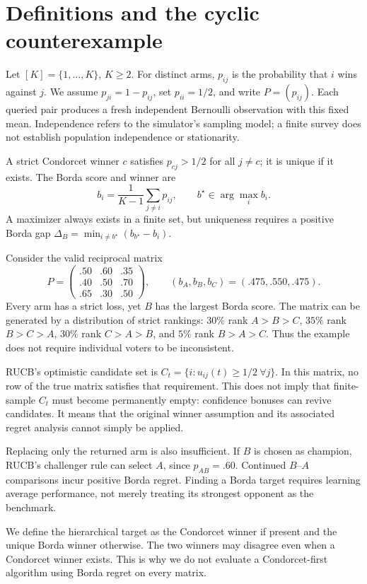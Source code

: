 \documentclass[11pt,a4paper]{article}
\begin{document}
\section{Definitions and the cyclic counterexample}

Let $[K]=\{1,\ldots,K\}$, $K\ge2$. For distinct arms, $p_{ij}$ is the probability that $i$ wins against $j$. We assume $p_{ji}=1-p_{ij}$, set $p_{ii}=1/2$, and write $P=(p_{ij})$. Each queried pair produces a fresh independent Bernoulli observation with this fixed mean. Independence refers to the simulator's sampling model; a finite survey does not establish population independence or stationarity.

A strict Condorcet winner $c$ satisfies $p_{cj}>1/2$ for all $j\ne c$; it is unique if it exists. The Borda score and winner are
\[
b_i=\frac{1}{K-1}\sum_{j\ne i}p_{ij},\qquad b^\star\in\arg\max_i b_i.
\]
A maximizer always exists in a finite set, but uniqueness requires a positive Borda gap $\Delta_B=\min_{i\ne b^\star}(b_{b^\star}-b_i)$.

Consider the valid reciprocal matrix
\[
P=\begin{pmatrix}.50&.60&.35\\.40&.50&.70\\.65&.30&.50\end{pmatrix},
\qquad (b_A,b_B,b_C)=(.475,.550,.475).
\]
Every arm has a strict loss, yet $B$ has the largest Borda score. The matrix can be generated by a distribution of strict rankings: $30\%$ rank $A>B>C$, $35\%$ rank $B>C>A$, $30\%$ rank $C>A>B$, and $5\%$ rank $B>A>C$. Thus the example does not require individual voters to be inconsistent.

RUCB's optimistic candidate set is $C_t=\{i:u_{ij}(t)\ge1/2\ \forall j\}$. In this matrix, no row of the true matrix satisfies that requirement. This does not imply that finite-sample $C_t$ must become permanently empty: confidence bonuses can revive candidates. It means that the original winner assumption and its associated regret analysis cannot simply be applied.

Replacing only the returned arm is also insufficient. If $B$ is chosen as champion, RUCB's challenger rule can select $A$, since $p_{AB}=.60$. Continued $B$--$A$ comparisons incur positive Borda regret. Finding a Borda target requires learning average performance, not merely treating its strongest opponent as the benchmark.

We define the hierarchical target as the Condorcet winner if present and the unique Borda winner otherwise. The two winners may disagree even when a Condorcet winner exists. This is why we do not evaluate a Condorcet-first algorithm using Borda regret on every matrix.
\end{document}
